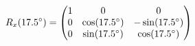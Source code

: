 \documentclass[preview]{standalone}
\begin{document}
\begin{align*}
\special{dvisvgm:raw <g id='unique000'>}R_x(17.5^\circ) = \begin{pmatrix} 1 & 0 & 0 \\ 0 & \cos(17.5^\circ) & -\sin(17.5^\circ) \\ 0 & \sin(17.5^\circ) & \cos(17.5^\circ) \end{pmatrix}\special{dvisvgm:raw </g>}
\end{align*}
\end{document}
